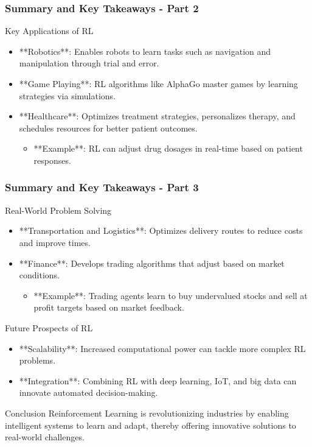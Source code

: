 \documentclass[aspectratio=169]{beamer}
\begin{document}
\begin{frame}[fragile]
  \frametitle{Summary and Key Takeaways - Part 2}

  \begin{block}{Key Applications of RL}
    \begin{itemize}
      \item **Robotics**: Enables robots to learn tasks such as navigation and manipulation through trial and error.
      \item **Game Playing**: RL algorithms like AlphaGo master games by learning strategies via simulations.
      \item **Healthcare**: Optimizes treatment strategies, personalizes therapy, and schedules resources for better patient outcomes.
      \begin{itemize}
        \item **Example**: RL can adjust drug dosages in real-time based on patient responses.
      \end{itemize}
    \end{itemize}
  \end{block}

\end{frame}

\begin{frame}[fragile]
  \frametitle{Summary and Key Takeaways - Part 3}

  \begin{block}{Real-World Problem Solving}
    \begin{itemize}
      \item **Transportation and Logistics**: Optimizes delivery routes to reduce costs and improve times.
      \item **Finance**: Develops trading algorithms that adjust based on market conditions.
      \begin{itemize}
        \item **Example**: Trading agents learn to buy undervalued stocks and sell at profit targets based on market feedback.
      \end{itemize}
    \end{itemize}
  \end{block}

  \begin{block}{Future Prospects of RL}
    \begin{itemize}
      \item **Scalability**: Increased computational power can tackle more complex RL problems.
      \item **Integration**: Combining RL with deep learning, IoT, and big data can innovate automated decision-making.
    \end{itemize}
  \end{block}

  \begin{block}{Conclusion}
    Reinforcement Learning is revolutionizing industries by enabling intelligent systems to learn and adapt, thereby offering innovative solutions to real-world challenges.
  \end{block}

\end{frame}
\end{document}
